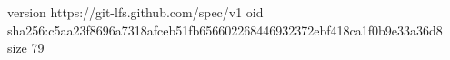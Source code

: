 version https://git-lfs.github.com/spec/v1
oid sha256:c5aa23f8696a7318afceb51fb656602268446932372ebf418ca1f0b9e33a36d8
size 79
